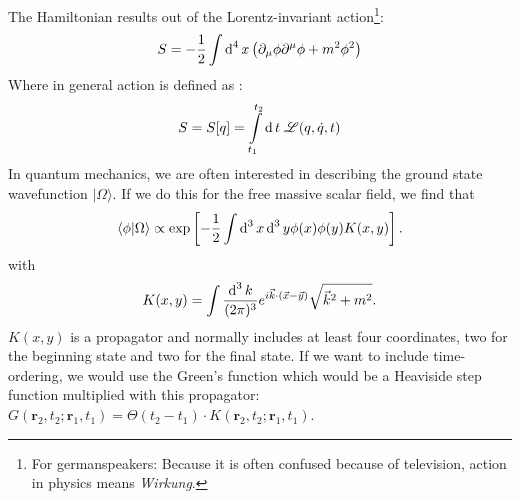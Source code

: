 	The Hamiltonian results out of the Lorentz-invariant action\footnote{For germanspeakers: Because it is often confused because of television, action in physics means \textit{Wirkung}.}:
		\begin{equation}
			S=-\frac{1}{2} \int \operatorname{d}^4 x \left(\partial_\mu \phi \partial^\mu \phi + m^2\phi^2 \right)
		\end{equation}
	Where in general action is defined as \cite{MechanikFliesbach}: 
		\begin{equation} 
			S=S[q]= \int\limits_{t_1}^{t_2} \operatorname{d} t \;\mathscr{L}(q,\dot q,t)
		\end{equation} 
	In quantum mechanics, we are often interested in describing the ground state wavefunction $|\Omega\rangle$. If we do this for the free massive scalar field, we find that \marginpar{[7]}
		\begin{equation}
			\langle\phi| \Omega\rangle \propto \exp\left[-\frac{1}{2} \int \operatorname{d}^3 x \operatorname{d}^3 y \phi(x)\phi(y) K(x,y)\right].
		\end{equation}
	with
		\begin{equation}
			K(x,y)=\int \frac{\operatorname{d}^3 k}{(2\pi)^3} e^{i\vec{k} \cdot (\vec{x}-\vec{y})} \sqrt{\vec{k}^2+m^2}.
		\end{equation}
	$K(x,y)$ is a propagator and normally includes at least four coordinates, two for the beginning state and two for the final state. If we want to include time-ordering, we would use the Green's function which would be a Heaviside step function multiplied with this propagator: $G(\textbf{r}_2,t_2;\textbf{r}_1,t_1)=\Theta(t_2-t_1)\cdot K(\textbf{r}_2,t_2;\textbf{r}_1,t_1)$.\cite{QEDbuch}\\
	
